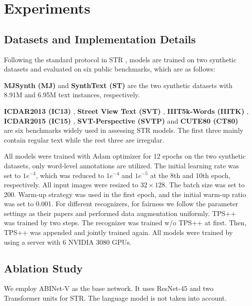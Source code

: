 \documentclass{article}
\begin{document}
\section{Experiments}

\subsection{Datasets and Implementation Details}
Following the standard protocol in STR \cite{Baekwhats_wrong_19ICCV}, models are trained on two synthetic datasets and evaluated on six public benchmarks, which are as follows:

\noindent\textbf{MJSynth (MJ)} \cite{MJor90K} and \textbf{SynthText (ST)} \cite{ST} are the two synthetic datasets with 8.91M and 6.95M text instances, respectively.



\noindent\textbf{ICDAR2013 (IC13)} \cite{ICDAR2013}, \textbf{Street View Text (SVT)} \cite{SVT}, \textbf{IIIT5k-Words (IIITK)} \cite{IIIT5K}, \textbf{ICDAR2015 (IC15)} \cite{ICDAR2015}, \textbf{SVT-Perspective (SVTP)} \cite{SVT-P} and \textbf{CUTE80 (CT80)} \cite{CUTE80} are six benchmarks widely used in assessing STR models. The first three mainly contain regular text while the rest three are irregular. 


All models were trained with Adam optimizer for 12 epochs on the two synthetic datasets, only word-level annotations are utilized. The initial learning rate was set to $1e^{-3}$, which was reduced to $1e^{-4}$ and $1e^{-5}$ at the 8th and 10th epoch, respectively. All input images were resized to $32\times128$. The batch size was set to 200. Warm-up strategy was used in the first epoch, and the initial warm-up ratio was set to 0.001. For different recognizers, for fairness we follow the parameter settings as their papers and performed data augmentation uniformly. TPS++ was trained by two steps. The recognizer was trained w/o TPS++ at first. Then, TPS++ was appended and jointly trained again. All models were trained by using a server with 6 NVIDIA 3080 GPUs.

\subsection{Ablation Study}
We employ ABINet-V \cite{ABInet21CVPR} as the base network. It uses ResNet-45 and two Transformer units for STR. The language model is not taken into account. 
\end{document}
